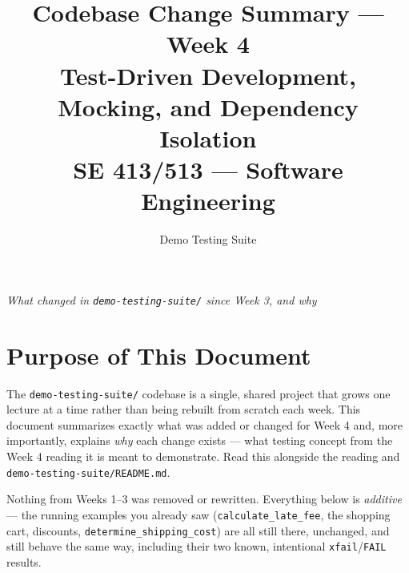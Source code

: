 \documentclass[11pt]{article}
\title{
  \textbf{Codebase Change Summary --- Week 4}\\[4pt]
  \large Test-Driven Development, Mocking, and Dependency Isolation\\[2pt]
  \normalsize SE 413/513 --- Software Engineering
}
\author{Demo Testing Suite}
\date{}
\begin{document}
\maketitle

\begin{center}
\textit{What changed in \texttt{demo-testing-suite/} since Week 3, and why}
\end{center}

\vspace{0.3cm}

\section{Purpose of This Document}
The \texttt{demo-testing-suite/} codebase is a single, shared project that
grows one lecture at a time rather than being rebuilt from scratch each
week. This document summarizes exactly what was added or changed for
Week 4 and, more importantly, explains \emph{why} each change exists ---
what testing concept from the Week 4 reading it is meant to demonstrate.
Read this alongside the reading and \texttt{demo-testing-suite/README.md}.

\begin{keyidea}
Nothing from Weeks 1--3 was removed or rewritten. Everything below is
\emph{additive} --- the running examples you already saw
(\texttt{calculate\_late\_fee}, the shopping cart, discounts,
\texttt{determine\_shipping\_cost}) are all still there, unchanged, and
still behave the same way, including their two known, intentional
\texttt{xfail}/\texttt{FAIL} results.
\end{keyidea}

\end{document}
